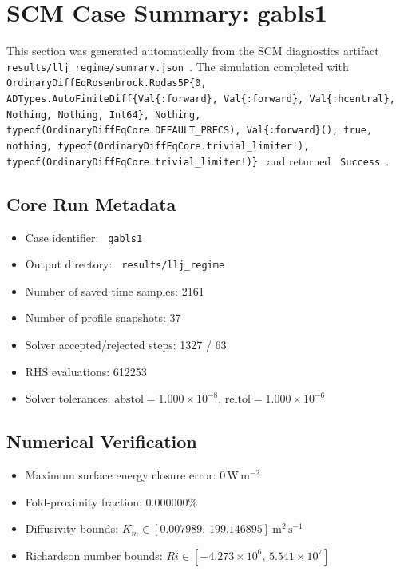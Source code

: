 \section{SCM Case Summary: gabls1}
\label{sec:scm_case_gabls1}

This section was generated automatically from the SCM diagnostics artifact
\texttt{ results/llj\_regime/summary.json }. The simulation completed with \texttt{ OrdinaryDiffEqRosenbrock.Rodas5P\{0, ADTypes.AutoFiniteDiff\{Val\{:forward\}, Val\{:forward\}, Val\{:hcentral\}, Nothing, Nothing, Int64\}, Nothing, typeof(OrdinaryDiffEqCore.DEFAULT\_PRECS), Val\{:forward\}(), true, nothing, typeof(OrdinaryDiffEqCore.trivial\_limiter!), typeof(OrdinaryDiffEqCore.trivial\_limiter!)\} }
and returned \texttt{ Success }.

\subsection{Core Run Metadata}
\begin{itemize}
  \item Case identifier: \texttt{ gabls1 }
  \item Output directory: \texttt{ results/llj\_regime }
  \item Number of saved time samples: 2161
  \item Number of profile snapshots: 37
  \item Solver accepted/rejected steps: 1327 / 63
  \item RHS evaluations: 612253
  \item Solver tolerances: $\mathrm{abstol}=1.000 \times 10^{-8}$, $\mathrm{reltol}=1.000 \times 10^{-6}$
\end{itemize}

\subsection{Numerical Verification}
\begin{itemize}
  \item Maximum surface energy closure error:
  $0\,\mathrm{W\,m^{-2}}$
  \item Fold-proximity fraction:
  $0.000000\%$
  \item Diffusivity bounds:
  $K_m \in [0.007989,\,199.146895]~\mathrm{m^2\,s^{-1}}$
  \item Richardson number bounds:
  $Ri \in [-4.273 \times 10^{6},\,5.541 \times 10^{7}]$
\end{itemize}

